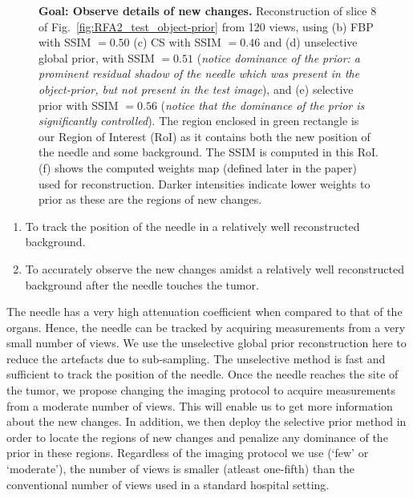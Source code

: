\documentclass[journal]{IEEEtran}
\begin{document}
\begin{figure}[!h]
\caption[Representative results-2]{\textbf{Goal: Observe details of new changes.} Reconstruction of slice 8 of Fig.~\ref{fig:RFA2_test_object-prior} from 120 views, using (b) FBP with SSIM $= 0.50$ (c) CS with SSIM $=0.46$ and (d) unselective global prior, with SSIM $=0.51$ (\emph{notice dominance of the prior: a prominent residual shadow of the needle which was present in the object-prior, but not present in the test image}), and (e) selective prior with SSIM $=0.56$ (\emph{notice that the dominance of the prior is significantly controlled}). The region enclosed in green rectangle is our Region of Interest (RoI) as it contains both the new position of the needle and some background. The SSIM is computed in this RoI. (f) shows the computed weights map (defined later in the paper) used for reconstruction. Darker intensities indicate lower weights to prior as these are the regions of new changes.}
\label{fig:RFA2_few_views}
\end{figure}

\begin{enumerate}
\item To track the position of the needle in a relatively well reconstructed background.
\item To accurately observe the new changes amidst a relatively well reconstructed background after the needle touches the tumor.
\end{enumerate} 

The needle has a very high attenuation coefficient when compared to that of the organs. Hence, the needle can be tracked by acquiring measurements from a very small number of views. We use the unselective global prior reconstruction here to reduce the artefacts due to sub-sampling. The unselective method is fast and sufficient to track the position of the needle.  Once the needle reaches the site of the tumor, we propose changing the imaging protocol to acquire measurements from a moderate number of views. This will enable us to get more information about the new changes. In addition, we then deploy the selective prior method in order to locate the regions of new changes and penalize any dominance of the prior in these regions.  Regardless of the imaging protocol we use (`few' or `moderate'), the number of views is smaller (atleast one-fifth) than the conventional number of views used in a standard hospital setting.
\end{document}
